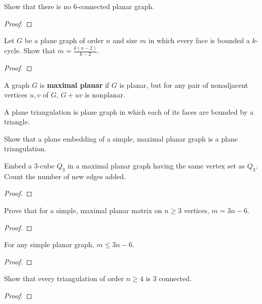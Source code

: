 \begin{exercise}
	Show that there is no $6$-connected planar graph.
\end{exercise}
\begin{proof}
\end{proof}

\begin{exercise}
	Let $G$ be a plane graph of order $n$ and size $m$ in which every face is bounded a $k$-cycle. Show that $m = \frac{k(n-2)}{k-2}$.
\end{exercise}
\begin{proof}
\end{proof}

\begin{definition}
	A graph $G$ is \textbf{maximal planar} if $G$ is planar, but for any pair of nonadjacent vertices $u,v$ of $G$, $G+uv$ is nonplanar.
\end{definition}

\begin{definition}
	A plane triangulation is plane graph in which each of its faces are bounded by a triangle.
\end{definition}

\begin{remark}
	Show that a plane embedding of a simple, maximal planar graph is a plane triangulation.
\end{remark}

\begin{exercise}
	Embed a $3$-cube $Q_3$ in a maximal planar graph having the same vertex set as $Q_3$. Count the number of new edges added.
\end{exercise}
\begin{proof}
\end{proof}

\begin{exercise}
	Prove that for a simple, maximal planar matrix on $n \ge 3$ vertices, $m = 3n-6$.
\end{exercise}
\begin{proof}
\end{proof}

\begin{exercise}
	For any simple planar graph, $m \le 3n - 6$.
\end{exercise}
\begin{proof}
\end{proof}

\begin{exercise}
	Show that every triangulation of order $n \ge 4$ is $3$ connected.
\end{exercise}
\begin{proof}
\end{proof}

